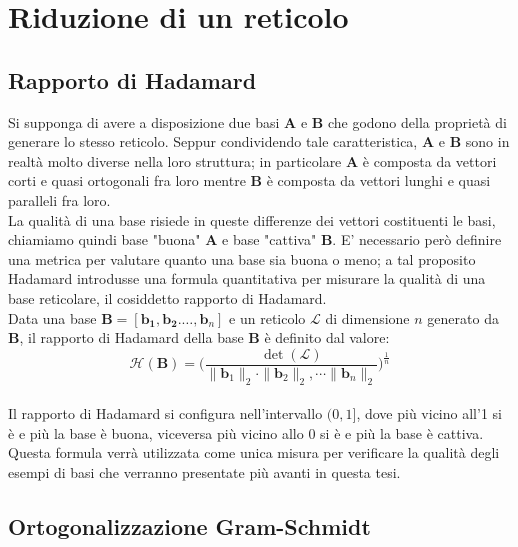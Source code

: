 \section{Riduzione di un reticolo}



\subsection{Rapporto di Hadamard}
Si supponga di avere a disposizione due basi $\mathbf{A}$ e $\mathbf{B}$ che godono della
proprietà di generare lo stesso reticolo. Seppur condividendo tale caratteristica, 
$\mathbf{A}$ e $\mathbf{B}$ sono in realtà molto diverse nella loro struttura; in particolare
$\mathbf{A}$ è composta da vettori corti e quasi ortogonali fra loro mentre $\mathbf{B}$ è
composta da vettori lunghi e quasi paralleli fra loro.\\
La qualità di una base risiede in queste differenze dei vettori costituenti le basi, chiamiamo
quindi base "buona" $\mathbf{A}$ e base "cattiva" $\mathbf{B}$.
E' necessario però definire una metrica per valutare quanto una base sia buona o meno; a tal
proposito Hadamard\cite{HDMRD08} introdusse una formula quantitativa per misurare la qualità
di una base reticolare, il cosiddetto rapporto di Hadamard. \\

Data una base $\mathbf{B} = [\mathbf{b_1}, \mathbf{b_2}. \dots, \mathbf{b}_n]$ e un reticolo
$\mathcal{L}$ di dimensione $n$ generato da $\mathbf{B}$, il rapporto di Hadamard della base
$\mathbf{B}$ è definito dal valore:
\[
\mathcal{H}(\mathbf{B}) = 
    \Biggl( 
        \frac{\det(\mathcal{L})}
        {\|\mathbf{b}_1\|_2 \cdot \|\mathbf{b}_2\|_2, \cdots \|\mathbf{b}_n\|_2} 
    \Biggr)^{\frac{1}{n}}
\]
\\
Il rapporto di Hadamard si configura nell'intervallo $(0, 1]$, dove più vicino all'1 si è 
e più la base è buona, viceversa più vicino allo 0 si è e più la base è cattiva. Questa formula
verrà utilizzata come unica misura per verificare la qualità degli esempi di basi che verranno
presentate più avanti in questa tesi.

\subsection{Ortogonalizzazione Gram-Schmidt}
 
